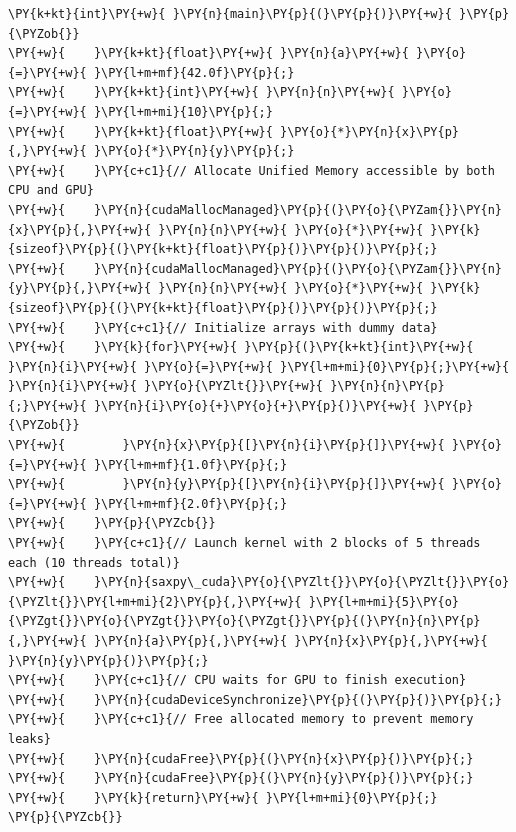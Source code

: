 \begin{Verbatim}[label=\makebox{\url{https://github.com/lucabaldini/cmepda/tree/master/slides/latex/snippets/cuda_saxpy.cu}},commandchars=\\\{\}]
\PY{k+kt}{int}\PY{+w}{ }\PY{n}{main}\PY{p}{(}\PY{p}{)}\PY{+w}{ }\PY{p}{\PYZob{}}
\PY{+w}{    }\PY{k+kt}{float}\PY{+w}{ }\PY{n}{a}\PY{+w}{ }\PY{o}{=}\PY{+w}{ }\PY{l+m+mf}{42.0f}\PY{p}{;}
\PY{+w}{    }\PY{k+kt}{int}\PY{+w}{ }\PY{n}{n}\PY{+w}{ }\PY{o}{=}\PY{+w}{ }\PY{l+m+mi}{10}\PY{p}{;}
\PY{+w}{    }\PY{k+kt}{float}\PY{+w}{ }\PY{o}{*}\PY{n}{x}\PY{p}{,}\PY{+w}{ }\PY{o}{*}\PY{n}{y}\PY{p}{;}
\PY{+w}{    }\PY{c+c1}{// Allocate Unified Memory accessible by both CPU and GPU}
\PY{+w}{    }\PY{n}{cudaMallocManaged}\PY{p}{(}\PY{o}{\PYZam{}}\PY{n}{x}\PY{p}{,}\PY{+w}{ }\PY{n}{n}\PY{+w}{ }\PY{o}{*}\PY{+w}{ }\PY{k}{sizeof}\PY{p}{(}\PY{k+kt}{float}\PY{p}{)}\PY{p}{)}\PY{p}{;}
\PY{+w}{    }\PY{n}{cudaMallocManaged}\PY{p}{(}\PY{o}{\PYZam{}}\PY{n}{y}\PY{p}{,}\PY{+w}{ }\PY{n}{n}\PY{+w}{ }\PY{o}{*}\PY{+w}{ }\PY{k}{sizeof}\PY{p}{(}\PY{k+kt}{float}\PY{p}{)}\PY{p}{)}\PY{p}{;}
\PY{+w}{    }\PY{c+c1}{// Initialize arrays with dummy data}
\PY{+w}{    }\PY{k}{for}\PY{+w}{ }\PY{p}{(}\PY{k+kt}{int}\PY{+w}{ }\PY{n}{i}\PY{+w}{ }\PY{o}{=}\PY{+w}{ }\PY{l+m+mi}{0}\PY{p}{;}\PY{+w}{ }\PY{n}{i}\PY{+w}{ }\PY{o}{\PYZlt{}}\PY{+w}{ }\PY{n}{n}\PY{p}{;}\PY{+w}{ }\PY{n}{i}\PY{o}{+}\PY{o}{+}\PY{p}{)}\PY{+w}{ }\PY{p}{\PYZob{}}
\PY{+w}{        }\PY{n}{x}\PY{p}{[}\PY{n}{i}\PY{p}{]}\PY{+w}{ }\PY{o}{=}\PY{+w}{ }\PY{l+m+mf}{1.0f}\PY{p}{;}
\PY{+w}{        }\PY{n}{y}\PY{p}{[}\PY{n}{i}\PY{p}{]}\PY{+w}{ }\PY{o}{=}\PY{+w}{ }\PY{l+m+mf}{2.0f}\PY{p}{;}
\PY{+w}{    }\PY{p}{\PYZcb{}}
\PY{+w}{    }\PY{c+c1}{// Launch kernel with 2 blocks of 5 threads each (10 threads total)}
\PY{+w}{    }\PY{n}{saxpy\_cuda}\PY{o}{\PYZlt{}}\PY{o}{\PYZlt{}}\PY{o}{\PYZlt{}}\PY{l+m+mi}{2}\PY{p}{,}\PY{+w}{ }\PY{l+m+mi}{5}\PY{o}{\PYZgt{}}\PY{o}{\PYZgt{}}\PY{o}{\PYZgt{}}\PY{p}{(}\PY{n}{n}\PY{p}{,}\PY{+w}{ }\PY{n}{a}\PY{p}{,}\PY{+w}{ }\PY{n}{x}\PY{p}{,}\PY{+w}{ }\PY{n}{y}\PY{p}{)}\PY{p}{;}
\PY{+w}{    }\PY{c+c1}{// CPU waits for GPU to finish execution}
\PY{+w}{    }\PY{n}{cudaDeviceSynchronize}\PY{p}{(}\PY{p}{)}\PY{p}{;}
\PY{+w}{    }\PY{c+c1}{// Free allocated memory to prevent memory leaks}
\PY{+w}{    }\PY{n}{cudaFree}\PY{p}{(}\PY{n}{x}\PY{p}{)}\PY{p}{;}
\PY{+w}{    }\PY{n}{cudaFree}\PY{p}{(}\PY{n}{y}\PY{p}{)}\PY{p}{;}
\PY{+w}{    }\PY{k}{return}\PY{+w}{ }\PY{l+m+mi}{0}\PY{p}{;}
\PY{p}{\PYZcb{}}
\end{Verbatim}